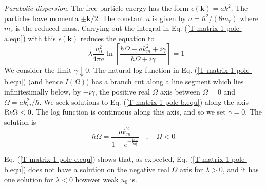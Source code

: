 \documentclass[aps,prb,superscriptaddress,letterpaper,amsmath,amssymb,twocolumn,preprintnumbers]{revtex4}
\begin{document}
\noindent
\textit{Parabolic dispersion}. The free-particle energy has the form $\epsilon (\mathbf{k}) = a k^2$. The particles have momenta $\pm \mathbf{k} / 2$. The constant $a$ is given by $a=\hbar^2 / ( 8 m_r )$ where $m_r$ is the reduced mass. Carrying out the integral in Eq. (\ref{T-matrix-1-pole-a.equ}) with this $\epsilon (\mathbf{k})$ reduces the equation to
\begin{equation}\label{T-matrix-1-pole-b.equ}
- \lambda \frac {u^2_0} {4 \pi a} \ln \left[ \frac {\hbar \Omega - a k^2_m + i \gamma} {\hbar \Omega + i \gamma} \right] = 1
\end{equation}
We consider the limit $\gamma \downarrow 0$. The natural log function in Eq. (\ref{T-matrix-1-pole-b.equ}) (and hence $I(\Omega)$) has a branch cut along a line segment which lies infinitesimally below, by $- i \gamma$, the positive real $\Omega$ axis between $\Omega=0$ and $ \Omega = a k^2_m / \hbar$. We seek solutions to Eq. (\ref{T-matrix-1-pole-b.equ}) along the axis ${\rm Re} \Omega < 0$. The log function is continuous along this axis, and so we set $\gamma = 0$. The solution is
\begin{equation}\label{T-matrix-1-pole-c.equ}
\hbar \Omega = \frac {a k^2_m} {1 - e^{- \frac{4 \pi a} {\lambda u^2_0}}} \quad , \quad \Omega < 0
\end{equation}



Eq. (\ref{T-matrix-1-pole-c.equ}) shows that, as expected, Eq. (\ref{T-matrix-1-pole-b.equ}) does not have a solution on the negative real $\Omega$ axis for $\lambda > 0$, and it has one solution for $\lambda < 0$ however weak $u_0$ is.\\
\end{document}
